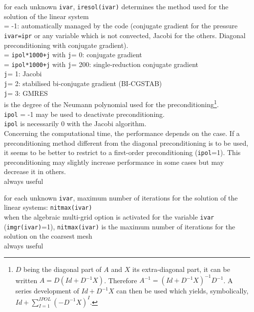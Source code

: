 {for each unknown {\tt ivar}, {\tt iresol(ivar)} determines the method used
for the solution of the linear system\\
\hspace*{1.3cm}= -1: automatically managed by the code (conjugate
gradient for the pressure {\tt ivar=ipr} or any variable which is not
convected, Jacobi for the others. Diagonal preconditioning with
conjugate gradient).\\
\hspace*{1.3cm}= {\tt ipol*1000+j} with {\tt j}= 0: conjugate gradient\\
\hspace*{1.3cm}= {\tt ipol*1000+j} with {\tt j}= 200: single-reduction conjugate gradient\\
\hspace*{1.3cm} {\tt j}= 1: Jacobi\\
\hspace*{1.3cm} {\tt j}= 2: stabilised
bi-conjugate gradient (BI-CGSTAB)\\
\hspace*{1.3cm} {\tt j}= 3: GMRES\\
\hspace*{1.3cm}{\tt ipol} is the degree of the Neumann polynomial used for the
preconditioning\footnote{$D$ being the diagonal part of $A$ and $X$ its
extra-diagonal part, it can be written
$A=D(Id+D^{-1}X)$. Therefore \mbox{$A^{-1}=(Id+D^{-1}X)^{-1}D^{-1}$}. A series
development of $Id+D^{-1}X$ can then be used which yields, symbolically,
\mbox{$Id+\sum\limits_{I=1}^{IPOL}\left(-D^{-1}X\right)^{I}$}.}.\\
{\tt ipol} = -1 may be used to deactivate preconditioning.\\
{\tt ipol} is necessarily 0 with the Jacobi algorithm.\\
Concerning the computational time, the performance depends on the
case. If a preconditioning method different from
the diagonal preconditioning is to be used, it seems to be better to restrict
to a first-order preconditioning ({\tt ipol}=1). This preconditioning may
slightly increase performance in some cases but may decrease it in others.\\
always useful}

{for each unknown {\tt ivar}, maximum number of iterations for the solution of
the linear systems: {\tt nitmax(ivar)}\\
when the algebraic multi-grid option is activated for the variable {\tt ivar}
({\tt imgr(ivar)}=1), {\tt nitmax(ivar)} is the maximum number of iterations
for the solution on the coarsest mesh\\
always useful}

